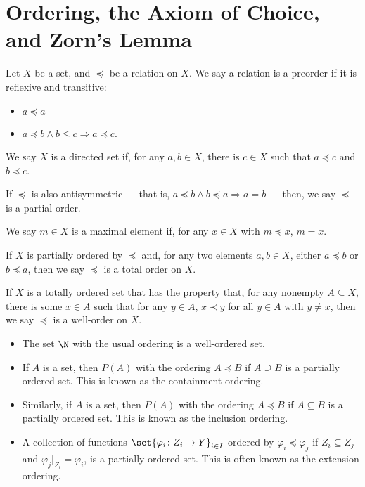 \section{Ordering, the Axiom of Choice, and Zorn's Lemma}%
\begin{definition}\label{def:ordered_sets}
Let $X$ be a set, and $\preceq $ be a relation on $X$. We say a relation is a preorder if it is reflexive and transitive:
\begin{itemize}
  \item $a\preceq a$
  \item $a\preceq b \wedge b\leq c\Rightarrow a\preceq c$.
\end{itemize}
We say $X$ is a directed set if, for any $a,b\in X$, there is $c\in X$ such that $a\preceq c$ and $b\preceq c$.\newline

If $\preceq$ is also antisymmetric --- that is, $a\preceq b\wedge b\preceq a \Rightarrow a = b$ --- then, we say $\preceq$ is a partial order.\newline

We say $m\in X$ is a maximal element if, for any $x\in X$ with $m\preceq x$, $m = x$.\newline

If $X$ is partially ordered by $\preceq$ and, for any two elements $a,b\in X$, either $a\preceq b$ or $b\preceq a$, then we say $\preceq$ is a total order on $X$.\newline

If $X$ is a totally ordered set that has the property that, for any nonempty $A\subseteq X$, there is some $x\in A$ such that for any $y\in A$, $x\prec y$ for all $y \in A$ with $y\neq x$, then we say $\preceq$ is a well-order on $X$.
\end{definition}
\begin{example}\hfill
  \begin{itemize}
    \item The set $\N$ with the usual ordering is a well-ordered set.
    \item If $A$ is a set, then $P(A)$ with the ordering $A\preceq B$ if $A\supseteq B$ is a partially ordered set. This is known as the containment ordering.
    \item Similarly, if $A$ is a set, then $P(A)$ with the ordering $A\preceq B$ if $A\subseteq B$ is a partially ordered set. This is known as the inclusion ordering.
    \item A collection of functions $\set{\varphi_{i}\colon Z_i\rightarrow Y}_{i\in I}$ ordered by $\varphi_{i}\preceq \varphi_j$ if $Z_i\subseteq Z_j$ and $\varphi_{j}|_{Z_i} = \varphi_i$, is a partially ordered set. This is often known as the extension ordering.
  \end{itemize}
\end{example}
